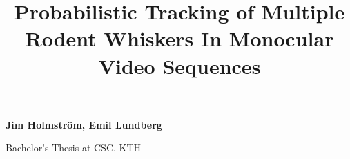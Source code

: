 \documentclass{article}
\begin{document}
\title{\bf Probabilistic Tracking of Multiple Rodent Whiskers In Monocular Video Sequences}

\date{}
\maketitle
\thispagestyle{empty}
\pagestyle{empty}

{\bf Jim Holmström, \; Emil Lundberg}

Bachelor's Thesis at CSC, KTH











{}

\end{document}
